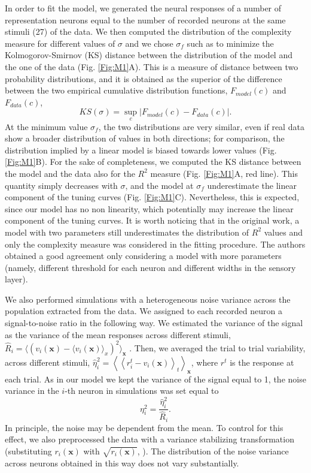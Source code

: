 \documentclass[a4paper]{article}%
\begin{document}
In order to fit the model, we generated the neural responses of a number of
representation neurons equal to the number of recorded neurons at the same
stimuli (27) of the data. We then computed the distribution of the complexity
measure for different values of $\sigma$ and we chose $\sigma_{f}$ such as to
minimize the Kolmogorov-Smirnov (KS) distance between the distribution of the
model and the one of the data (Fig. \ref{Fig:M1}A).  This is a measure of distance between two probability distributions, and it is obtained as the superior of the difference between the two empirical cumulative distribution functions, $F_{model}(c)$ and $F_{data}(c)$,
\begin{equation}
KS (\sigma) = \sup_c |F_{model}(c) - F_{data}(c)|.
\end{equation}
At the minimum value $\sigma_{f}$, the
two distributions are very similar, even if real data show a broader
distribution of values in both directions; for comparison, the distribution
implied by a linear model is biased towards lower values (Fig. \ref{Fig:M1}B).
For the sake of completeness, we computed the KS distance between the model
and the data also for the $R^{2}$ measure (Fig. \ref{Fig:M1}A, red line). This
quantity simply decreases with $\sigma$, and the model at $\sigma_{f}$
underestimate the linear component of the tuning curves (Fig. \ref{Fig:M1}C).
Nevertheless, this is expected, since our model has no non linearity, which
potentially may increase the linear component of the tuning curves. It is
worth noticing that in the original work, a model with two parameters still
underestimates the distribution of $R^{2}$ values and only the complexity
measure was considered in the fitting procedure. The authors obtained a good
agreement only considering a model with more parameters (namely, different
threshold for each neuron and different widths in the sensory layer).

We also performed simulations with a heterogeneous noise variance across the
population extracted from the data. We assigned to each recorded neuron a
signal-to-noise ratio in the following way. We estimated the variance of the
signal as the variance of the mean responses across different stimuli,
$\hat{R}_{i} = \langle\left(  v_{i}(\mathbf{x}) - \langle v_{i}(\mathbf{x}) \rangle_{x} \right)
^{2}\rangle_{\mathbf{x}}$ . Then, we averaged the trial to trial variability, across
different stimuli, $\hat{\eta}^{2}_{i} = \left\langle \left\langle r^{t}
_{i}-v_{i}(\mathbf{x})\right\rangle _{t}\right\rangle _{\mathbf{x}}$, where $r^{t}$ is the
response at each trial. As in our model we kept the variance of the signal
equal to 1, the noise variance in the $i$-th neuron in simulations was set
equal to
\begin{equation}
\eta_{i}^{2} = \frac{\hat{\eta}_{i}^{2}}{\hat{R}_{i}}. \label{Eq:snr-data}%
\end{equation}
In principle, the noise may be dependent from the mean. To control for this
effect, we also preprocessed the data with a variance stabilizing
transformation (substituting $r_i(\mathbf{x}) $ with $\sqrt{r_i(\mathbf{x})}$,
\cite{SRJ1999TheStatistics}). The distribution of the noise variance across
neurons obtained in this way does not vary substantially.
\end{document}

